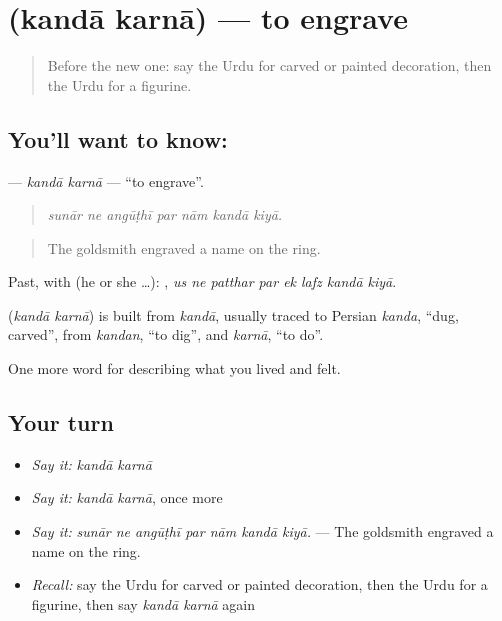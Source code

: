 \section[\texorpdfstring{\ur{کندہ} \ur{کرنا} (kandā karnā)}{کندہ کرنا (kandā karnā)}]{  (kandā karnā) — to engrave}

\label{lesson:UR-C516-kanda-karna}



\begin{quote}
Before the new one: say the Urdu for carved or painted decoration, then the Urdu for a figurine.
\end{quote}

\subsection*{You'll want to know:  }
\textbf{ } — \emph{kandā karnā} — \textquotedblleft{}to engrave\textquotedblright{}.

\begin{quote}
      
\end{quote}

\begin{quote}
\emph{sunār ne angūṭhī par nām kandā kiyā.}
\end{quote}

\begin{quote}
The goldsmith engraved a name on the ring.
\end{quote}

Past, with  (he or she …):        , \emph{us ne patthar par ek lafz kandā kiyā}.

\begin{cousinweb}
\textbf{ } (\emph{kandā karnā}) is built from \emph{kandā}, usually traced to Persian \emph{kanda}, \textquotedblleft{}dug, carved\textquotedblright{}, from \emph{kandan}, \textquotedblleft{}to dig\textquotedblright{}, and \emph{karnā}, \textquotedblleft{}to do\textquotedblright{}.
\end{cousinweb}

\begin{grammarlens}[title={What you've built}]
One more word for describing what you lived and felt.
\end{grammarlens}

\subsection*{Your turn}
\begin{itemize}
\raggedright
  \item \emph{Say it:} \emph{kandā karnā}
  \item \emph{Say it:} \emph{kandā karnā}, once more
  \item \emph{Say it:} \emph{sunār ne angūṭhī par nām kandā kiyā.} — The goldsmith engraved a name on the ring.
  \item \emph{Recall:} say the Urdu for carved or painted decoration, then the Urdu for a figurine, then say \emph{kandā karnā} again
\end{itemize}

